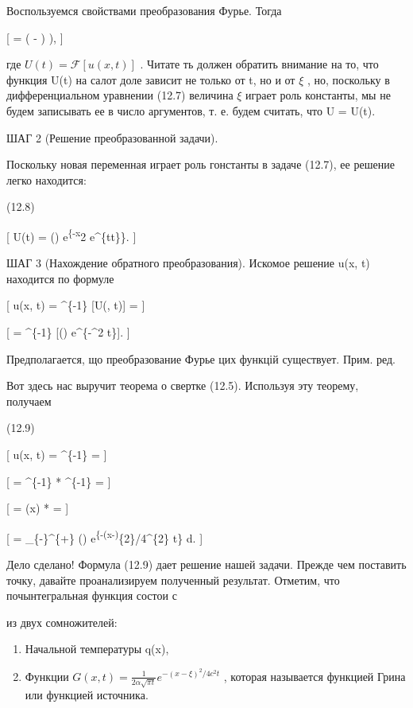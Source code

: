 \documentclass[
  ukrainian,
]{article}
\begin{document}
Воспользуемся свойствами преобразования Фурье. Тогда

{[}  =
( \Phi - \phi)  \phi), {]}

где \(U(t) = \mathcal{F}[u(x, t)]\) . Читате ть должен обратить внимание
на то, что функция U(t) на салот доле зависит не только от t, но и от
\(\xi\) , но, поскольку в дифференциальном уравнении (12.7) величина
\(\xi\) играет роль константы, мы не будем записывать ее в число
аргументов, т. е. будем считать, что U = U(t).

ШАГ 2 (Решение преобразованной задачи).

Поскольку новая переменная играет роль гонстанты в задаче (12.7), ее
решение легко находится:

(12.8)

{[} U(t) = \Phi(\xi) e\textsuperscript{\{-x}2 e\^{}\{tt\}\}. {]}

ШАГ 3 (Нахождение обратного преобразования). Искомое решение u(x, t)
находится по формуле

{[} u(x, t) = \^{}\{-1\} {[}U(\xi, t){]} = {]}

{[} = \^{}\{-1\} {[}\Phi(\xi) e\^{}\{-\alpha \xi\^{}2 t\}{]}.
{]}

Предполагается, що преобразование Фурье цих функцій существует. Прим.
ред.

Вот здесь нас выручит теорема о свертке (12.5). Используя эту теорему,
получаем

(12.9)

{[} u(x, t) = \^{}\{-1\}
 = {]}

{[} = \^{}\{-1\} \left[ \Phi(\xi) \right] *
\^{}\{-1\}  = {]}

{[} = \Phi(x) *
 
= {]}

{[} =  \int\_\{-\infty\}\^{}\{+\infty\}
\Phi(\xi) e\textsuperscript{\{-(x-\xi)}\{2\}/4\alpha\^{}\{2\} t\} d\xi.
{]}

Дело сделано! Формула (12.9) дает решение нашей задачи. Прежде чем
поставить точку, давайте проанализируем полученный результат. Отметим,
что почынтегральная функция состои с

из двух сомножителей:

\begin{enumerate}
\def\labelenumi{\arabic{enumi}.}
\item
  Начальной температуры q(x),
\item
  Функции
  \(G(x, t) = \frac{1}{2\alpha \sqrt{\pi t}} e^{-(x-\xi)^2/4c^2t}\) ,
  которая называется функцией Грина или функцией источника.
\end{enumerate}
\end{document}
